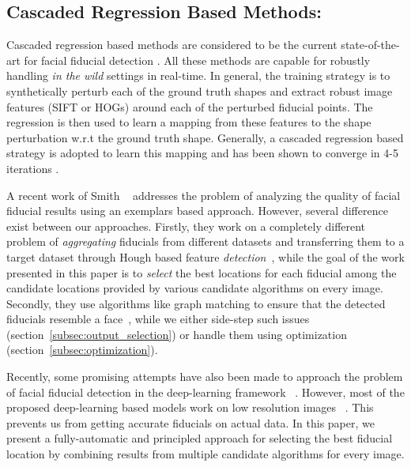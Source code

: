 \subsection{Cascaded Regression Based Methods:}
Cascaded regression based methods are considered to be the current state-of-the-art for facial fiducial detection
\cite{CaoWWS12,XiongD13,akshay_wild_2014,6909614,Tzimiropoulos_2015_CVPR}. All these methods are capable for robustly handling \emph{in the wild} settings in real-time. In general, the training strategy is to synthetically perturb each of the ground truth
shapes and extract robust image features (SIFT or HOGs) around each of the perturbed fiducial points. The regression
is then used to learn a mapping from these features to the shape perturbation w.r.t the ground truth shape.
Generally, a cascaded regression based strategy is adopted to learn this mapping and has been shown to converge
in 4-5 iterations \cite{XiongD13,akshay_wild_2014}.  

 A recent work of Smith \etal ~\cite{smithECCV14_ED} addresses the problem of analyzing the quality of facial fiducial
results using an exemplars based approach. However, several difference exist between our approaches.
Firstly, they work on a completely different problem of \emph{aggregating} fiducials from different datasets and transferring them to a target dataset through Hough based feature \emph{detection}~\cite{shenCVPR13_retrieval},
while the goal of the work presented in this paper is to \emph{select} the best locations for each fiducial among
the candidate locations provided by various candidate algorithms on every image. 
Secondly, they use algorithms like graph matching to ensure that the detected fiducials resemble a
face~\cite{zhouICCV13_EGM}, while we either side-step such issues
(section~\ref{subsec:output_selection}) or handle them using optimization
(section~\ref{subsec:optimization}).
 

Recently, some promising attempts have also been made to approach the problem of facial fiducial detection in the deep-learning framework ~\cite{zhangECCV14_deepfacealign}. However, most of the proposed deep-learning based models work on low resolution images ~\cite{zhangECCV14_deepfacealign,DBLP:journals/corr/ZhangLLT14}.
This prevents us from getting accurate fiducials on actual data.
In this paper, we present a fully-automatic
and principled approach for selecting the best fiducial location by combining results from multiple
candidate algorithms for every image.
